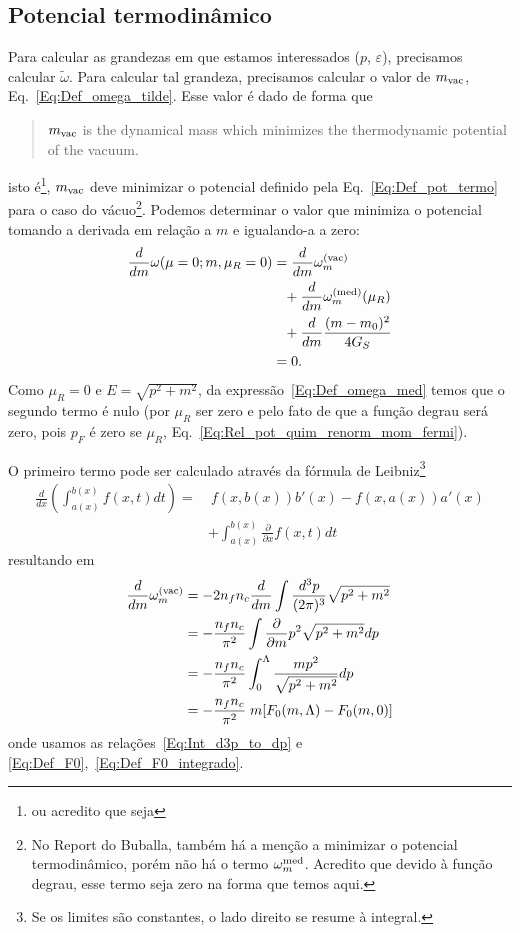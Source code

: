 \subsection{Potencial termodinâmico}

Para calcular as grandezas em que estamos interessados ($p$, $\varepsilon$), precisamos calcular $\tilde{\omega}$. Para calcular tal grandeza, precisamos calcular o valor de $m_{\rm{vac}}$, Eq.~\eqref{Eq:Def_omega_tilde}. Esse valor é dado de forma que\cite{Buballa1996}
\begin{quote}
	$m_{\rm{vac}}$ is the dynamical mass which minimizes the thermodynamic potential of the vacuum.
\end{quote}
%
isto é\footnote{ou acredito que seja}, $m_{\rm{vac}}$ deve minimizar o potencial definido pela Eq.~\ref{Eq:Def_pot_termo} para o caso do vácuo\footnote{No Report do Buballa, também há a menção a minimizar o potencial termodinâmico, porém não há o termo $\omega_m^{\rm{med}}$. Acredito que devido à função degrau, esse termo seja zero na forma que temos aqui.}. Podemos determinar o valor que minimiza o potencial tomando a derivada em relação a $m$ e igualando-a a zero:
\begin{align}
	\frac{d}{dm} \omega(\mu = 0; m, \mu_R = 0) &= \frac{d}{dm}\omega_m^{\rm{(vac)}} \\
	&\phantom{=} + \frac{d}{dm}\omega_m^{\rm{(med)}}(\mu_R) \nonumber \\
	&\phantom{=} + \frac{d}{dm}\frac{(m - m_0)^2}{4G_S} \nonumber \\
	&= 0.\nonumber
\end{align}
%
Como $\mu_R = 0$ e $E = \sqrt{p^2+m^2}$, da expressão~\eqref{Eq:Def_omega_med} temos que o segundo termo é nulo (por $\mu_R$ ser zero e pelo fato de que a função degrau será zero, pois $p_F$ é zero se $\mu_R$, Eq.~\eqref{Eq:Rel_pot_quim_renorm_mom_fermi}).

O primeiro termo pode ser calculado através da fórmula de Leibniz\footnote{Se os limites são constantes, o lado direito se resume à integral.}
\begin{equation}
\begin{split}
	\frac{d}{dx} \left(\int_{a(x)}^{b(x)} f(x,t) dt\right) =&~ f(x, b(x))b'(x) - f(x, a(x))a'(x) \\
	&+ \int_{a(x)}^{b(x)}\frac{\partial}{\partial x}f(x,t) dt
\end{split}
\end{equation}
%
resultando em
\begin{align}
	\frac{d}{dm}\omega_m^{\rm{(vac)}} &= -2 n_f n_c\frac{d}{dm}\int \frac{d^3p}{(2\pi)^3} \sqrt{p^2 + m^2} \\
	&= - \frac{n_f n_c}{\pi^2} \int \frac{\partial}{\partial m} p^2\sqrt{p^2+m^2} dp \\
	&= - \frac{n_f n_c}{\pi^2} \int_0^\Lambda \frac{mp^2}{\sqrt{p^2+m^2}} dp \\
	&= - \frac{n_f n_c}{\pi^2} \;m [F_0(m, \Lambda) - F_0(m,0)]
\end{align}
%
onde usamos as relações~\eqref{Eq:Int_d3p_to_dp} e \eqref{Eq:Def_F0},~\eqref{Eq:Def_F0_integrado}.

